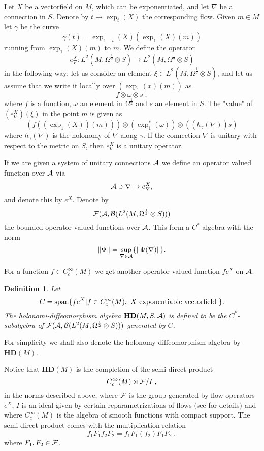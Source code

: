 \documentclass[12pt]{article}
\def\ca{{\cal A}}
\def\cb{{\cal B}}
\def\cd{{\cal D}}
\def\cf{{\cal F}}
\def\ch{{\cal H}}
\newtheorem{definition}[thm]{Definition}
\newcommand{\cF}{{\cal F}}
\begin{document}
Let $X$ be a vectorfield on $M$, which can be exponentiated, and let $\nabla$ be a connection in $S$.  Denote by $t\to \exp_t(X)$ the corresponding flow. Given $m\in M$ let $\gamma$ be the curve  
$$\gamma (t)=\exp_{1-t} (X) (\exp_1 (X)(m) )$$
running from $\exp_1 (X)(m)$ to $m$. We define the operator 
$$e^X_\nabla :L^2 (M , \Omega^{\frac12} \otimes S) \to L^2 (M , \Omega^{\frac12} \otimes S)$$
in the following way: let us consider an element $\xi \in L^2(M,\Omega^{\frac12} \otimes S)$, and let us assume that we write it locally over $(\exp_1(x)(m))$ as  $$f \otimes \omega \otimes s\;,$$ where $f$ is a function, $\omega$ an element in $\Omega^{\frac12}$ and $s$ an element in $S$. The "value" of $(e^X_\nabla)(\xi)$ in the point  $m$ is given as
$$
(f((\exp_1(X))(m))) \otimes (\exp_1^*(\omega)) \otimes ((h_\gamma (\nabla) )s)
$$
where $h_\gamma(\nabla)$ is the holonomy of $\nabla$ along $\gamma$.
If the connection $\nabla$ is unitary with respect to the metric on $S$, then  $e^X_\nabla$ is a unitary operator. 

If we are given a system of unitary connections $\ca$ we define an operator valued function over $\ca$ via
$$\ca \ni \nabla \to e^X_\nabla    ,$$
and denote this by $e^X$. Denote by $$\cf (\ca , \cb (L^2(M,\Omega^{\frac12}\otimes S)) )$$ the bounded operator valued functions over $\ca$. This form a $C^*$-algebra with the norm
$$\| \Psi \| =  \sup_{\nabla \in \ca} \{\|  \Psi (\nabla )\| \}. $$ 
  
For a function $f\in C^\infty_c (M)$ we get another operator valued function $fe^X$ on $\ca$. 



\begin{definition}
Let 
$$C =   \hbox{span} \{ fe^X |f\in C^\infty_c(M), \ X \hbox{ exponentiable vectorfield }\}  . $$
The holonomi-diffeomorphism algebra $\mathbf{HD}(M,S,\ca) $ is defined to be the $C^*$-subalgebra of  $\cf (\ca , \cb (L^2(M,\Omega^{\frac12}\otimes S)) )$ generated by $C$.
\end{definition}


For simplicity we shall also denote the holonomy-diffeomorphism algebra by $\mathbf{HD}(M) $.

Notice that $\mathbf{HD}(M)$ is the completion of
the semi-direct product
$$
C^\infty_c (M)  \rtimes  \cF  / I\;,
$$
in the norms described above, where $\cf$ is the group generated by flow operators $e^X$, $I$ is an ideal given by certain reparametrizations of flows (see \cite{AGnew} for details) and where $C^\infty_c (M) $ is the algebra of smooth functions with compact support. The semi-direct product comes with the multiplication relation
$$f_1F_1 f_2 F_2=f_1 F_1 (f_2) F_1 F_2 \;,  $$
where $F_1,F_2\in\cf$.
\end{document}
